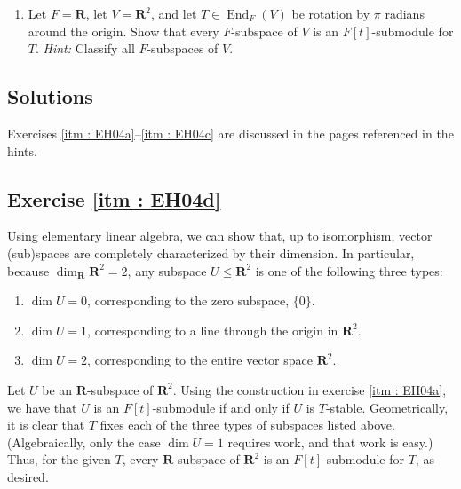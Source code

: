 \documentclass[oneside, english, 11pt]{article}
\newcommand{\spaceSolution}[2]{#2}
\newcommand{\spaceSolution}[2]{\vspace{#1}}
\newcommand{\fontHint}[1]{\emph{Hint:} #1}
\DeclareMathOperator{\Endomorphism}{End}
\newcommand{\R}{\reals}
\newcommand{\reals}{\mathbf{R}}
\newcommand{\submodule}{\leq}
\begin{document}
\begin{enumerate}[label=(\alph*)]
\item\label{itm : EH04d} Let $F = \R$, let $V = \R^{2}$, and let $T \in \Endomorphism_{F}(V)$ be rotation by $\pi$ radians around the origin. Show that every $F$-subspace of $V$ is an $F[t]$-submodule for $T$. \fontHint{Classify all $F$-subspaces of $V$.}
\end{enumerate}



\spaceSolution{0in}{%
\subsection*{Solutions}

Exercises \ref{itm : EH04a}--\ref{itm : EH04c} are discussed in the pages referenced in the hints.

\subsection*{Exercise \ref{itm : EH04d}}

Using elementary linear algebra, we can show that, up to isomorphism, vector (sub)spaces are completely characterized by their dimension. In particular, because $\dim_{\R} \R^{2} = 2$, any subspace $U \submodule \R^{2}$ is one of the following three types:
\begin{enumerate}
\item $\dim U = 0$, corresponding to the zero subspace, $\{0\}$.
\item $\dim U = 1$, corresponding to a line through the origin in $\R^{2}$.
\item $\dim U = 2$, corresponding to the entire vector space $\R^{2}$.
\end{enumerate}

Let $U$ be an $\R$-subspace of $\R^{2}$. Using the construction in exercise \ref{itm : EH04a}, we have that $U$ is an $F[t]$-submodule if and only if $U$ is $T$-stable. Geometrically, it is clear that $T$ fixes each of the three types of subspaces listed above. (Algebraically, only the case $\dim U = 1$ requires work, and that work is easy.) Thus, for the given $T$, every $\R$-subspace of $\R^{2}$ is an $F[t]$-submodule for $T$, as desired.}%
\end{document}
